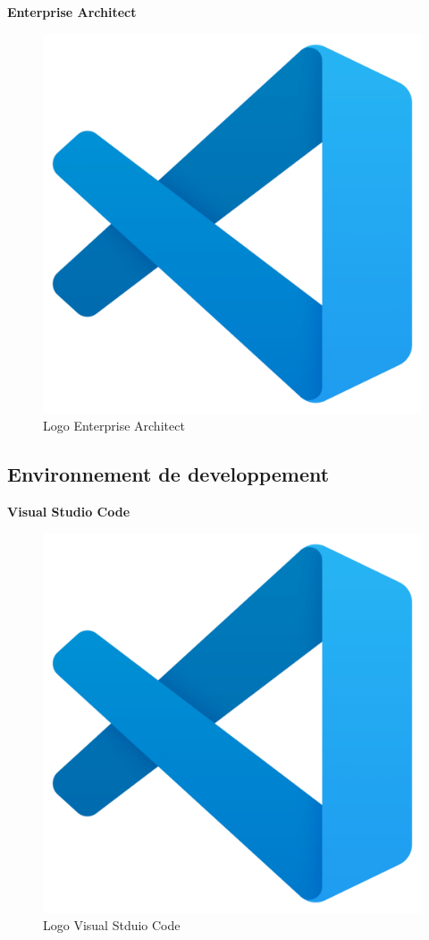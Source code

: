 \large 
\textbf{Enterprise Architect}
\begin{figure}[htbp]
   \centering
   \includegraphics[scale=0.09]{Images/vs.png} 
   \caption{Logo Enterprise Architect}
   \label{fig:vscode}
\end{figure}

\subsection{Environnement de developpement}
\large 
\textbf{Visual Studio Code}

\begin{figure}[htbp]
   \centering
   \includegraphics[scale=0.09]{Images/vs.png} 
   \caption{Logo Visual Stduio Code}
   \label{fig:vscode}
\end{figure}

